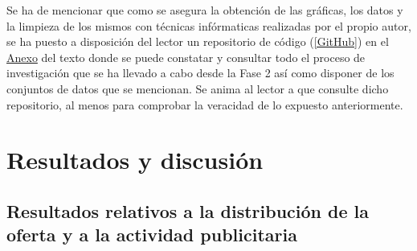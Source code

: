 \documentclass[a4paper,10pt]{article}
\begin{document}
\begin{multicols}{2}
            \noindent
            Se ha de mencionar que como se asegura la obtención de las gráficas, los datos y la limpieza de los mismos con técnicas infórmaticas realizadas por el 
            propio autor, se ha puesto a disposición del lector un repositorio de código (\hyperlink{github}{[GitHub]}) en el \hyperlink{anexo}{Anexo} 
            del texto donde se puede constatar y consultar todo el proceso de investigación que se ha llevado a cabo desde la Fase 2 así como disponer de los conjuntos de datos que se mencionan. Se anima al lector a que consulte dicho repositorio, al menos para comprobar la veracidad de lo expuesto     anteriormente.

    \end{multicols}
    \setlength{\columnsep}{10pt}

    \section{Resultados y discusión}

        \subsection{Resultados relativos a la distribución de la oferta y a la actividad publicitaria}
\end{document}
